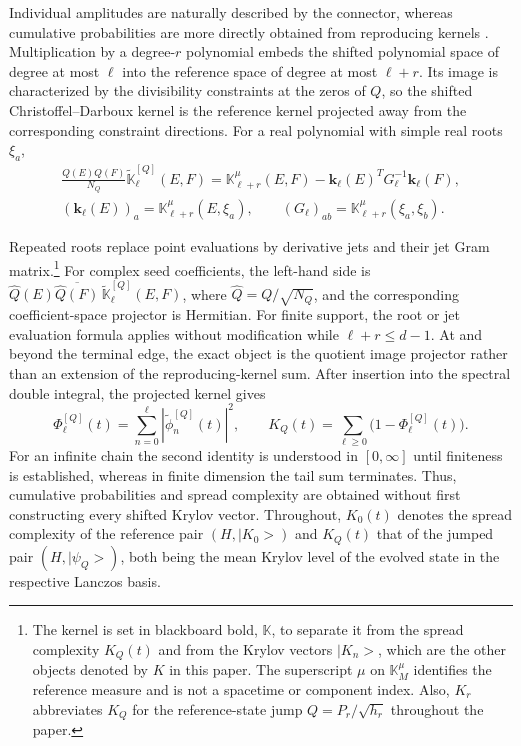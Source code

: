 \documentclass[a4paper,11pt]{article}
\def\ket#1{|#1>}%
\theoremstyle{definition}
\theoremstyle{remark}
\newcommand{\ket}[1]{|#1\rangle}
\newcommand{\tphi}{\widetilde\phi}
\newcommand{\tK}{\widetilde{\mathbb K}}
\newcommand{\Qhat}{\widehat Q}
\begin{document}
Individual amplitudes are naturally described by the connector, whereas cumulative probabilities are more directly obtained from reproducing kernels \cite{SimonCDK}. Multiplication by a degree-$r$ polynomial embeds the shifted polynomial space of degree at most $\ell$ into the reference space of degree at most $\ell+r$. Its image is characterized by the divisibility constraints at the zeros of $Q$, so the shifted Christoffel--Darboux kernel is the reference kernel projected away from the corresponding constraint directions. For a real polynomial with simple real roots $\xi_a$,
\begin{equation}
\begin{gathered}
   \frac{Q(E)Q(F)}{N_Q}\tK_\ell^{[Q]}(E,F)
   =\mathbb K_{\ell+r}^{\mu}(E,F)
    -\mathbf k_\ell(E)^T G_\ell^{-1}\mathbf k_\ell(F),\\[2pt]
   (\mathbf k_\ell(E))_a=\mathbb K_{\ell+r}^{\mu}(E,\xi_a),
   \qquad
   (G_\ell)_{ab}=\mathbb K_{\ell+r}^{\mu}(\xi_a,\xi_b).
\end{gathered}
   \label{eq:intro-projected-kernel}
\end{equation}

Repeated roots replace point evaluations by derivative jets and their jet Gram matrix.\footnote{The kernel is set in blackboard bold, $\mathbb K$, to separate it from the spread
complexity $K_Q(t)$ and from the Krylov vectors $\ket{K_n}$, which are the other objects denoted by $K$ in this paper. The superscript $\mu$ on $\mathbb K_M^\mu$ identifies the reference measure and is not a
spacetime or component index. Also, $K_r$ abbreviates $K_Q$ for the
reference-state jump $Q=P_r/\sqrt{h_r}$ throughout the paper.} For complex seed coefficients, the left-hand side is
$\Qhat(E)\overline{\Qhat(F)}\,\tK_\ell^{[Q]}(E,F)$, where
$\Qhat=Q/\sqrt{N_Q}$, and the corresponding coefficient-space projector is Hermitian. For finite support, the root or jet evaluation formula applies without modification while $\ell+r\le d-1$. At and beyond the terminal edge, the exact object is the quotient image projector rather than an extension of the reproducing-kernel sum. After insertion into the spectral double integral, the projected kernel gives
\begin{equation}
   \Phi_\ell^{[Q]}(t)
   =\sum_{n=0}^{\ell}|\tphi_n^{[Q]}(t)|^2,
   \qquad
   K_Q(t)=\sum_{\ell\ge0}\bigl(1-\Phi_\ell^{[Q]}(t)\bigr).
\end{equation}
For an infinite chain the second identity is understood in $[0,\infty]$ until finiteness is established, whereas in finite dimension the tail sum terminates. Thus, cumulative probabilities and spread complexity are obtained without first constructing every
shifted Krylov vector. Throughout, $K_0(t)$ denotes the spread complexity of the reference pair
$(H,\ket{K_0})$ and $K_Q(t)$ that of the jumped pair $(H,\ket{\psi_Q})$, both being the mean
Krylov level of the evolved state in the respective Lanczos basis.
\end{document}
